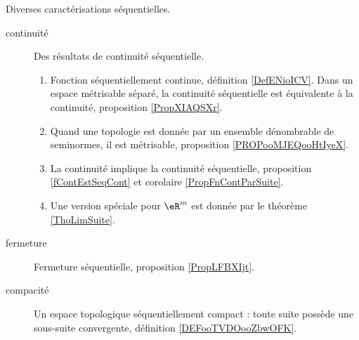 Diverses caractérisations séquentielles.
\begin{description}
	\item[continuité]
		Des résultats de continuité séquentielle.
		\begin{enumerate}
			\item
			      Fonction séquentiellement continue, définition \ref{DefENioICV}. Dans un espace métrisable séparé, la continuité séquentielle est équivalente à la continuité, proposition \ref{PropXIAQSXr}.
			\item
			      Quand une topologie est donnée par un ensemble dénombrable de seminormes, il est métrisable, proposition \ref{PROPooMJEQooHtIyeX}.
			\item
			      La continuité implique la continuité séquentielle, proposition \ref{fContEstSeqCont} et corolaire \ref{PropFnContParSuite}.
			\item
			      Une version spéciale pour \( \eR^m\) est donnée par le théorème \ref{ThoLimSuite}.
		\end{enumerate}
	\item[fermeture]
		Fermeture séquentielle, proposition \ref{PropLFBXIjt}.
	\item[compacité]
		Un espace topologique séquentiellement compact : toute suite possède une sous-suite convergente, définition \ref{DEFooTVDOooZbwOFK}.
\end{description}
